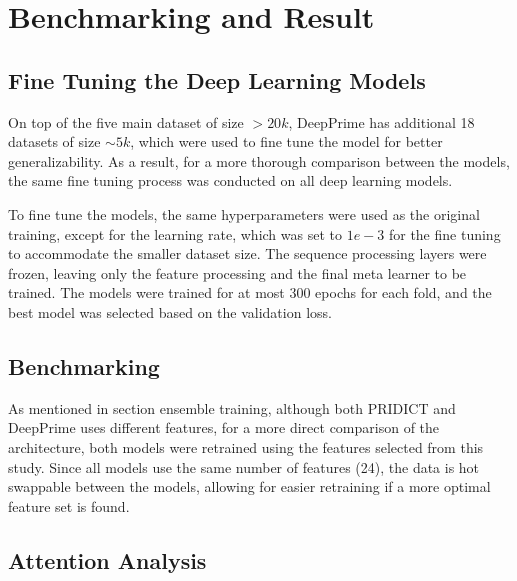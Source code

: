 \chapter{Benchmarking and Result}

\section{Fine Tuning the Deep Learning Models}

On top of the five main dataset of size $> 20k$, DeepPrime has additional 18 datasets of size $\sim5k$, which were used to fine tune the model for better generalizability. As a result, for a more thorough comparison between the models, the same fine tuning process was conducted on all deep learning models.

To fine tune the models, the same hyperparameters were used as the original training, except for the learning rate, which was set to $1e-3$ for the fine tuning to accommodate the smaller dataset size. The sequence processing layers were frozen, leaving only the feature processing and the final meta learner to be trained. The models were trained for at most 300 epochs for each fold, and the best model was selected based on the validation loss.

\section{Benchmarking}

As mentioned in section {ensemble training}, although both PRIDICT and DeepPrime uses different features, for a more direct comparison of the architecture, both models were retrained using the features selected from this study. Since all models use the same number of features (24), the data is hot swappable between the models, allowing for easier retraining if a more optimal feature set is found.

\section{Attention Analysis}
\label{sec:attention_analysis}

